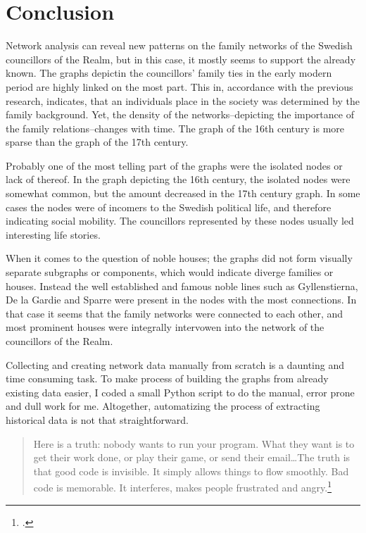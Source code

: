 \section{Conclusion}
Network analysis can reveal new patterns on the family networks of the Swedish councillors of the Realm, but in this case, it mostly seems to support the already known. The graphs depictin the councillors' family ties in the early modern period are highly linked on the most part. This in, accordance with the previous research, indicates, that an individuals place in the society was determined by the family background. Yet, the density of the networks–depicting the importance of the family relations–changes with time. The graph of the 16th century is more sparse than the graph of the 17th century.

Probably one of the most telling part of the graphs were the isolated nodes or lack of thereof. In the graph depicting the 16th century, the isolated nodes were somewhat common, but the amount decreased in the 17th century graph. In some cases the nodes were of incomers to the Swedish political life, and therefore indicating social mobility. The councillors represented by these nodes usually led interesting life stories.

When it comes to the question of noble houses; the graphs did not form visually separate subgraphs or components, which would indicate diverge families or houses. Instead the well established and famous noble lines such as Gyllenstierna, De la Gardie and Sparre were present in the nodes with the most connections. In that case it seems that the family networks were connected to each other, and most prominent houses were integrally intervowen into the network of the councillors of the Realm.

Collecting and creating network data manually from scratch is a daunting and time consuming task. To make process of building the graphs from already existing data easier, I coded a small Python script to do the manual, error prone and dull work for me. Altogether, automatizing the process of extracting historical data is not that straightforward.

\begin{quote}
	Here is a truth: nobody wants to run your program. What they want is to get their work done, or play their game, or send their email\ldots The truth is that good code is invisible. It simply allows things to flow smoothly. Bad code is memorable. It interferes, makes people frustrated and angry.\footcite[prefix p. XVI]{python}
\end{quote}

